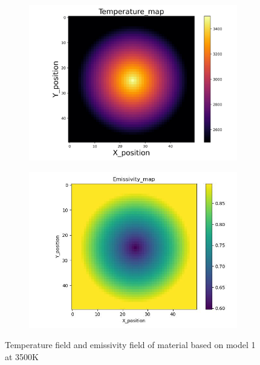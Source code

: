 \begin{figure}[htbp]
    \centering
    \begin{subfigure}{0.49\textwidth}
        \centering
        \includegraphics[width=\textwidth]{figures/t_field_3500linear.jpg}
    \end{subfigure}
    \begin{subfigure}{0.49\textwidth}
        \centering
        \includegraphics[width=\textwidth]{figures/raw_data/21/T3500/emi_field.jpg}
    \end{subfigure}
    \caption{Temperature field and emissivity field of material based on model 1 at 3500K}
    \label{fig: data_3500}
\end{figure}

